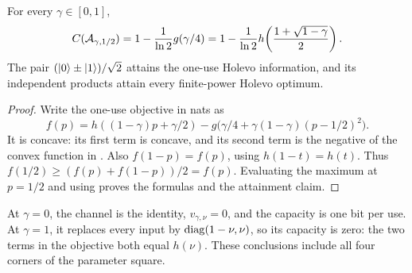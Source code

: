 \begin{corollary}\label{cor:unital}
For every $\gamma\in[0,1]$,
\[
 C(\mathcal A_{\gamma,1/2})
 =1-\frac1{\ln2}g(\gamma/4)
 =1-\frac1{\ln2}h\!\left(\frac{1+\sqrt{1-\gamma}}2\right).
\]
The pair $(\lvert 0\rangle\pm\lvert 1\rangle)/\sqrt2$ attains the one-use Holevo
information, and its independent products attain every finite-power
Holevo optimum.
\end{corollary}
\begin{proof}
Write the one-use objective in nats as
\[
 f(p)=h((1-\gamma)p+\gamma/2)
       -g\bigl(\gamma/4+\gamma(1-\gamma)(p-1/2)^2\bigr).
\]
It is concave: its first term is concave, and its second term is the
negative of the convex function in . Also
$f(1-p)=f(p)$, using $h(1-t)=h(t)$. Thus
$f(1/2)\ge(f(p)+f(1-p))/2=f(p)$. Evaluating the maximum at $p=1/2$
and using  proves the formulas and the attainment claim.
\end{proof}

At $\gamma=0$, the channel is the identity, $v_{\gamma,\nu}=0$, and
the capacity is one bit per use. At $\gamma=1$, it replaces every
input by $\operatorname{diag}(1-\nu,\nu)$, so its capacity is zero: the two terms
in the objective both equal $h(\nu)$. These conclusions include all
four corners of the parameter square.
